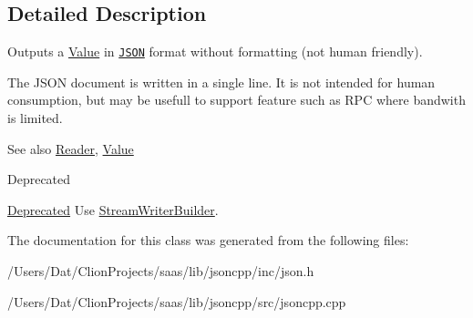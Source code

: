 \subsection{Detailed Description}
Outputs a \hyperlink{class_json_1_1_value}{Value} in \href{http://www.json.org}{\tt J\+S\+ON} format without formatting (not human friendly). 

The J\+S\+ON document is written in a single line. It is not intended for \textquotesingle{}human\textquotesingle{} consumption, but may be usefull to support feature such as R\+PC where bandwith is limited. \begin{DoxySeeAlso}{See also}
\hyperlink{class_json_1_1_reader}{Reader}, \hyperlink{class_json_1_1_value}{Value} 
\end{DoxySeeAlso}
\begin{DoxyRefDesc}{Deprecated}
\item[\hyperlink{deprecated__deprecated000008}{Deprecated}]Use \hyperlink{class_json_1_1_stream_writer_builder}{Stream\+Writer\+Builder}. \end{DoxyRefDesc}


The documentation for this class was generated from the following files\+:\begin{DoxyCompactItemize}
\item 
/\+Users/\+Dat/\+Clion\+Projects/saas/lib/jsoncpp/inc/json.\+h\item 
/\+Users/\+Dat/\+Clion\+Projects/saas/lib/jsoncpp/src/jsoncpp.\+cpp\end{DoxyCompactItemize}
